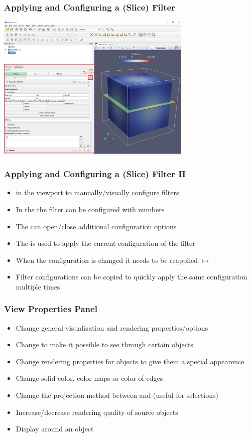 \begin{frame}
  \frametitle{Applying and Configuring a (Slice) Filter}
	\begin{center}
	\includegraphics[width=0.7\textwidth]{screenshots/filter-apply.png}		
	\end{center}
\end{frame}

\begin{frame}
  \frametitle{Applying and Configuring a (Slice) Filter II}
    \begin{itemize}
      \item {} in the viewport to manually/visually configure filters
      \item In the  the filter can be configured with numbers
      \item The  can open/close additional configuration options			
      \item The  is used to apply the current configuration of the filter						
      \item When the configuration is changed it needs to be reapplied $\mapsto$ 
			\item Filter configurations can be copied to quickly apply the same configuration multiple times
    \end{itemize}
\end{frame}
  
\begin{frame}
  \frametitle{View Properties Panel}
    \begin{itemize}
      \item Change general visualization and rendering properties/options
      \item Change  to make it possible to see through certain objects
      \item Change rendering properties for objects to give them a special appearence
      \item Change solid color, color maps or color of edges
      \item Change the projection method between  and  (useful for selections)
      \item Increase/decrease rendering quality of source objects
      \item Display  around an object
    \end{itemize}
\end{frame}

